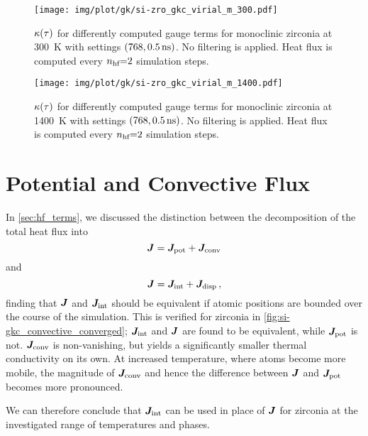 \clearpage
\begin{figure}
  \texttt{[image: img/plot/gk/si-zro\_gkc\_virial\_m\_300.pdf]}
  \caption{
  $\kappa(\tau)$ for differently computed gauge terms
  for monoclinic zirconia at \qty{300}{K}
  with  settings $(768, \qty{0.5}{ns})$.
  No filtering is applied. Heat flux is computed every $n_{\text{hf}}{=}2$ simulation steps.
  }
  \label{fig:si-gkc_virial_m_300}
\end{figure}

\begin{figure}
  \texttt{[image: img/plot/gk/si-zro\_gkc\_virial\_m\_1400.pdf]}
  \caption{
  $\kappa(\tau)$ for differently computed gauge terms
  for monoclinic zirconia at \qty{1400}{K}
  with  settings $(768, \qty{0.5}{ns})$.
  No filtering is applied. Heat flux is computed every $n_{\text{hf}}{=}2$ simulation steps.
  }
  \label{fig:si-gkc_virial_m_1400}
\end{figure}


\clearpage
\clearpage
\section{Potential and Convective Flux}
\label{sec:si-gkc_conv}

In \cref{sec:hf_terms}, we discussed the distinction between the decomposition of the total heat flux into
\begin{equation}
	\boldsymbol{J} = \boldsymbol{J}_\text{pot} + \boldsymbol{J}_\text{conv}
\end{equation}
and
\begin{equation}
	\boldsymbol{J} = \boldsymbol{J}_\text{int} + \boldsymbol{J}_\text{disp} \, ,
\end{equation}
finding that $\boldsymbol{J}$ and $\boldsymbol{J}_\text{int}$ should be equivalent if atomic positions are bounded over the course of the simulation.
This is verified for zirconia in \cref{fig:si-gkc_convective_converged}; $\boldsymbol{J}_\text{int}$ and $\boldsymbol{J}$ are found to be equivalent, while $\boldsymbol{J}_\text{pot}$ is not. $\boldsymbol{J}_\text{conv}$ is non-vanishing, but yields a significantly smaller thermal conductivity on its own.
At increased temperature, where atoms become more mobile, the magnitude of $\boldsymbol{J}_\text{conv}$ and hence the difference between $\boldsymbol{J}$ and $\boldsymbol{J}_\text{pot}$ becomes more pronounced.

We can therefore conclude that $\boldsymbol{J}_\text{int}$ can be used in place of $\boldsymbol{J}$ for zirconia at the investigated range of temperatures and phases.


